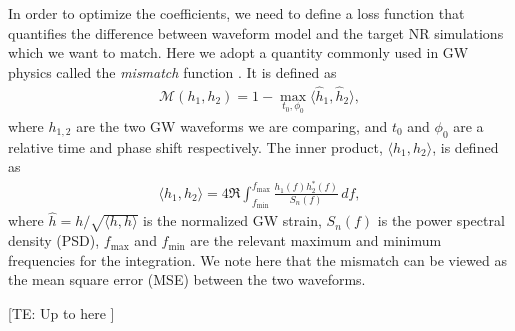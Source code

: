 \documentclass[twocolumn]{aastex631}
\newcommand{\te}[1]{{\color{rr}[TE: #1 ]}}
\begin{document}
In order to optimize the coefficients, we need to define a loss function that
quantifies the difference between waveform model and the target NR simulations which we want to match.
Here we adopt a quantity commonly used in GW physics called the \textit{mismatch} function \citep{husa2016frequency}. 
It is defined as
\begin{align} \label{eq:mismatch}
	\mathcal{M}(h_1, h_2)=1-\max_{t_0, \phi_0}\langle \hat{h}_1, \hat{h}_2\rangle,
\end{align}
where $h_{1,2}$ are the two GW waveforms we are comparing, and $t_0$ and $\phi_0$
are a relative time and phase shift respectively. 
The inner product, $\langle h_1, h_2 \rangle$, is defined as 
\begin{align}\label{eq:inner_prod}
	\langle h_1, h_2 \rangle = 4\Re\int_{f_{\mathrm{min}}}^{f_{\mathrm{max}}}\frac{h_1(f)h_2^{\ast}(f)}{S_n(f)}\,df,
\end{align}
where $\hat{h}=h/\sqrt{\langle h, h \rangle}$ is the normalized GW strain,
$S_n(f)$ is the power spectral density (PSD), $f_{\mathrm{max}}$ and $f_{\mathrm{min}}$ are
the relevant maximum and minimum frequencies for the integration.
We note here that the mismatch can be viewed as the mean square error (MSE) between the
two waveforms.

\te{Up to here}
\end{document}
